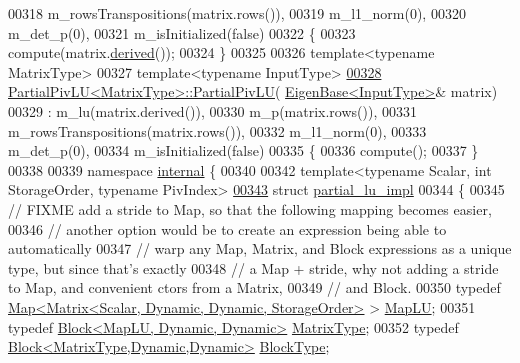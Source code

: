 \begin{DoxyCode}
00318     m\_rowsTranspositions(matrix.rows()),
00319     m\_l1\_norm(0),
00320     m\_det\_p(0),
00321     m\_isInitialized(false)
00322 \{
00323   compute(matrix.\hyperlink{group___core___module_a324b16961a11d2ecfd2d1b7dd7946545}{derived}());
00324 \}
00325 
00326 \textcolor{keyword}{template}<\textcolor{keyword}{typename} MatrixType>
00327 \textcolor{keyword}{template}<\textcolor{keyword}{typename} InputType>
\hyperlink{group___l_u___module_a4efc917d31d0e9d76781a97509309061}{00328} \hyperlink{group___l_u___module_class_eigen_1_1_partial_piv_l_u}{PartialPivLU<MatrixType>::PartialPivLU}(
      \hyperlink{group___core___module_struct_eigen_1_1_eigen_base}{EigenBase<InputType>}& matrix)
00329   : m\_lu(matrix.derived()),
00330     m\_p(matrix.rows()),
00331     m\_rowsTranspositions(matrix.rows()),
00332     m\_l1\_norm(0),
00333     m\_det\_p(0),
00334     m\_isInitialized(false)
00335 \{
00336   compute();
00337 \}
00338 
00339 \textcolor{keyword}{namespace }\hyperlink{namespaceinternal}{internal} \{
00340 
00342 \textcolor{keyword}{template}<\textcolor{keyword}{typename} Scalar, \textcolor{keywordtype}{int} StorageOrder, \textcolor{keyword}{typename} PivIndex>
\hyperlink{struct_eigen_1_1internal_1_1partial__lu__impl}{00343} \textcolor{keyword}{struct }\hyperlink{struct_eigen_1_1internal_1_1partial__lu__impl}{partial\_lu\_impl}
00344 \{
00345   \textcolor{comment}{// FIXME add a stride to Map, so that the following mapping becomes easier,}
00346   \textcolor{comment}{// another option would be to create an expression being able to automatically}
00347   \textcolor{comment}{// warp any Map, Matrix, and Block expressions as a unique type, but since that's exactly}
00348   \textcolor{comment}{// a Map + stride, why not adding a stride to Map, and convenient ctors from a Matrix,}
00349   \textcolor{comment}{// and Block.}
00350   \textcolor{keyword}{typedef} \hyperlink{group___core___module_class_eigen_1_1_map}{Map<Matrix<Scalar, Dynamic, Dynamic, StorageOrder>}
       > \hyperlink{group___core___module_class_eigen_1_1_map}{MapLU};
00351   \textcolor{keyword}{typedef} \hyperlink{group___core___module_class_eigen_1_1_block}{Block<MapLU, Dynamic, Dynamic>} 
      \hyperlink{group___core___module_class_eigen_1_1_block}{MatrixType};
00352   \textcolor{keyword}{typedef} \hyperlink{group___core___module_class_eigen_1_1_block}{Block<MatrixType,Dynamic,Dynamic>} 
      \hyperlink{group___core___module_class_eigen_1_1_block}{BlockType};

\end{DoxyCode}
